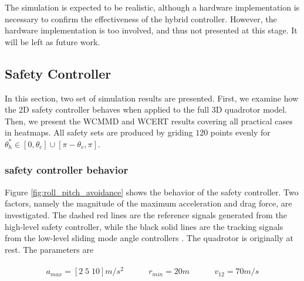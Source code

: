 \documentclass[journal,11pt,onecolumn,draftclsnofoot,]{IEEEtran}
\begin{document}
The simulation is expected to be realistic, although a hardware implementation is necessary to confirm the effectiveness of the hybrid controller. However, the hardware implementation is too involved, and thus not presented at this stage. It will be left as future work.

\subsection{Safety Controller} \label{sec:safety_controller_result}

In this section, two set of simulation results are presented. First, we examine how the 2D safety controller behaves when applied to the full 3D quadrotor model. Then, we present the WCMMD and WCERT results covering all practical cases in heatmaps. All safety sets are produced by griding $120$ points evenly for $\theta_h^*\in[0,\theta_c] \cup [\pi-\theta_c,\pi]$.

\subsubsection{safety controller behavior}

Figure \ref{fig:roll_pitch_avoidance} shows the behavior of the safety controller. Two factors, namely the magnitude of the maximum acceleration and drag force, are investigated. The dashed red lines are the reference signals generated from the high-level safety controller, while the black solid lines are the tracking signals from the low-level sliding mode angle controllers \cite{bouadi2011adaptive}. The quadrotor is originally at rest. The parameters are

\begin{equation*}
\label{eq:safety_param}
\begin{split}
\begin{matrix}
a_{max} = \left[ 2 \; 5 \; 10 \right] m/s^2 \;\;\;\;\;\;\;\;&
r_{min} = 20m \;\;\;\;\;\;\;\;&
v_{12} = 70m/s \\
\end{matrix}
\end{split}
\end{equation*}
\end{document}
